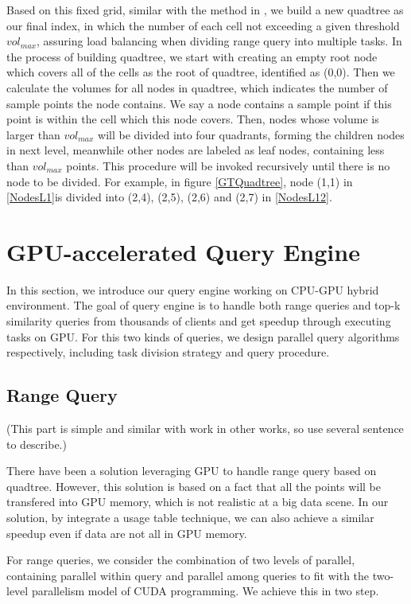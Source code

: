 \documentclass[conference]{IEEEtran}
\begin{document}
Based on this fixed grid, similar with the method in \cite{DBLP:conf/gis/LettichOS15}, we build a new quadtree as our final index, in which the number of each cell not exceeding a given threshold $vol_{max}$, assuring load balancing when dividing range query into multiple tasks. In the process of building quadtree, we start with creating an empty root node which covers all of the cells as the root of quadtree, identified as (0,0). Then we calculate the volumes for all nodes in quadtree, which indicates the number of sample points the node contains. We say a node contains a sample point if this point is within the cell which this node covers. Then, nodes whose volume is larger than $vol_{max}$ will be divided into four quadrants, forming the children nodes in next level, meanwhile other nodes are labeled as leaf nodes, containing less than $vol_{max}$ points. This procedure will be invoked recursively until there is no node to be divided. For example, in figure \ref{GTQuadtree}, node (1,1) in \ref{NodesL1}is divided into (2,4), (2,5), (2,6) and (2,7) in \ref{NodesL12}.





\section{GPU-accelerated Query Engine}
In this section, we introduce our query engine working on CPU-GPU hybrid environment. The goal of query engine is to handle both range queries and top-k similarity queries from thousands of clients and get speedup through executing tasks on GPU. For this two kinds of queries, we design parallel query algorithms respectively, including task division strategy and query procedure.

\subsection{Range Query}
(This part is simple and similar with work in other works, so use several sentence to describe.)

There have been a solution\cite{GPUTaxi} leveraging GPU to handle range query based on quadtree. However, this solution is based on a fact that all the points will be transfered into GPU memory, which is not realistic at a big data scene. In our solution, by integrate a usage table technique, we can also achieve a similar speedup even if data are not all in GPU memory.

 For range queries, we consider the combination of two levels of parallel, containing parallel within query and parallel among queries to fit with the two-level parallelism model of CUDA programming. We achieve this in two step. 
\end{document}
